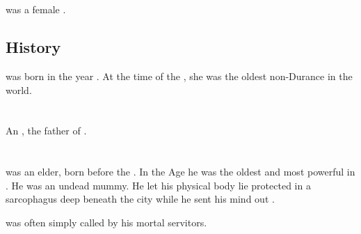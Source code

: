 \section{\Hesherritan}
\index{\Hesherritan}
\Hesherritan was a female \ophidian.









\subsection{History}
\Hesherritan was born in the year . 
At the time of the \thirdbanewar, she was the oldest non-Durance \ophidian in the world.















\section{\HesodNerga}
\index{\HesodNerga}
An \ophidian{}, the father of .
















\section{\Ishtacca}
\index{\Ishtacca}
\Ishtacca was an \ophidian elder, born before the \firstbanewar. 
In the \Scatha Age he was the oldest and most powerful \ophidian in . 
He was an undead mummy.
He let his physical body lie protected in a sarcophagus deep beneath the city while he sent his mind out .

\Ishtacca was often simply called  by his mortal servitors. 










